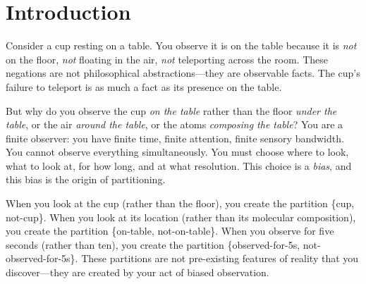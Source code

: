 \documentclass[twocolumn,10pt]{article}
\theoremstyle{definition}
\theoremstyle{remark}
\begin{document}
\begin{abstract}
\vspace{0.2cm}
\noindent We prove: (1) observers are finite and create partitions through biased observation (Section~\ref{sec:finite_observers}), (2) memory erasure eliminates temporal localization (Section~\ref{sec:finite_observers}), (3) Loschmidt's requirements are contradictory (Section~\ref{sec:finite_observers}), (4) causal structure creates observer-independent distinguishability (Section~\ref{sec:finite_observers}), (5) partitions cannot be deleted (Section~\ref{sec:irreversibility}), (6) enumeration is self-referential (Section~\ref{sec:self-reference}), and (7) therefore reversal is impossible (Section~\ref{sec:loschmidt}). This establishes the Second Law as a consequence of temporal structure, not statistical mechanics.

\vspace{0.3cm}
\noindent\textbf{Keywords:} Loschmidt's paradox, thermodynamic irreversibility, temporal paradox, causality, partition theory, Second Law
\end{abstract}


\section{Introduction}
\label{sec:introduction}

Consider a cup resting on a table. You observe it is on the table because it is \textit{not} on the floor, \textit{not} floating in the air, \textit{not} teleporting across the room. These negations are not philosophical abstractions—they are observable facts. The cup's failure to teleport is as much a fact as its presence on the table.

\vspace{0.2cm}
\noindent But why do you observe the cup \textit{on the table} rather than the floor \textit{under the table}, or the air \textit{around the table}, or the atoms \textit{composing the table}? You are a finite observer: you have finite time, finite attention, finite sensory bandwidth. You cannot observe everything simultaneously. You must choose where to look, what to look at, for how long, and at what resolution. This choice is a \textit{bias}, and this bias is the origin of partitioning.

\vspace{0.2cm}
\noindent When you look at the cup (rather than the floor), you create the partition \{cup, not-cup\}. When you look at its location (rather than its molecular composition), you create the partition \{on-table, not-on-table\}. When you observe for five seconds (rather than ten), you create the partition \{observed-for-5s, not-observed-for-5s\}. These partitions are not pre-existing features of reality that you discover—they are created by your act of biased observation.
\end{document}
